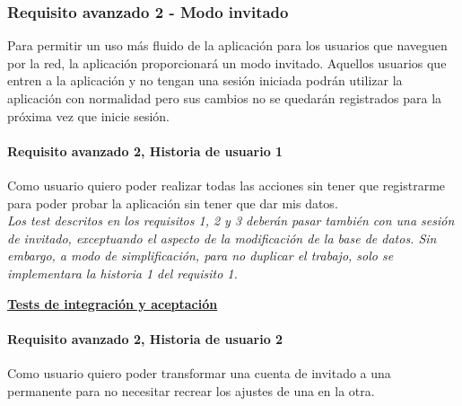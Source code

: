 \documentclass[../ei103948-project-documentation.tex]{subfiles}
\begin{document}
					\testAvanzadoE

					\newpage


			


			\subsubsection{Requisito avanzado 2 - Modo invitado}
				Para permitir un uso más fluido de la aplicación para los usuarios que naveguen por la red, la aplicación proporcionará un modo invitado. Aquellos usuarios que entren a la aplicación y no tengan una sesión iniciada podrán utilizar la aplicación con normalidad pero sus cambios no se quedarán registrados para la próxima vez que inicie sesión.


				\paragraph{Requisito avanzado 2, Historia de usuario 1}
				Como usuario quiero poder realizar todas las acciones sin tener que registrarme para poder probar la aplicación sin tener que dar mis datos.\\

				\textit{Los test descritos en los requisitos 1, 2 y 3 deberán pasar también con una sesión de invitado, exceptuando el aspecto de la modificación de la base de datos. Sin embargo, a modo de simplificación, para no duplicar el trabajo, solo se implementara la historia 1 del requisito 1.}


				\begin{center}
					\textbf{\underline{Tests de integración y aceptación}}
				\end{center}

				\testAvanzadoF

				\paragraph{Requisito avanzado 2, Historia de usuario 2}
				Como usuario quiero poder transformar una cuenta de invitado a una permanente para no necesitar recrear los ajustes de una en la otra.
\end{document}
